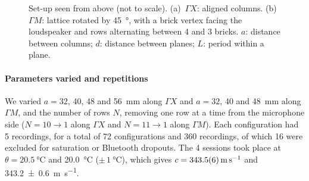 \documentclass[9pt,a4paper,twocolumn]{extarticle}
\begin{document}
\begin{figure}[b]
{}
  \caption{Set-up seen from above (not to scale). (a)~$\Gamma X$: aligned columns. (b)~$\Gamma M$: lattice rotated by \SI{45}{\degree}, with a brick vertex facing the loudspeaker and rows alternating between 4 and 3 bricks. $a$: distance between columns; $d$: distance between planes; $L$: period within a plane.}
  \label{fig:setup}
\end{figure}

\paragraph{Parameters varied and repetitions}
We varied $a = 32$, 40, 48 and \SI{56}{\milli\metre} along $\Gamma X$ and $a = 32$, 40 and \SI{48}{\milli\metre} along $\Gamma M$, and the number of rows $N$, removing one row at a time from the microphone side ($N = 10 \to 1$ along $\Gamma X$ and $N = 11 \to 1$ along $\Gamma M$). Each configuration had 5 recordings, for a total of 72 configurations and 360 recordings, of which 16 were excluded for saturation or Bluetooth dropouts. The 4 sessions took place at $\theta = \SI{20.5}{\celsius}$ and \SI{20.0}{\celsius} ($\pm\,\SI{1}{\celsius}$), which gives $c = \SI{343.5 \pm 0.6}{\metre\per\second}$ and \SI{343.2 \pm 0.6}{\metre\per\second}.
\end{document}
